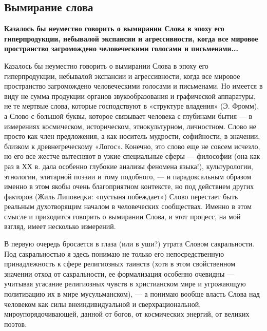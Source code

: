  
 
 

\subsection{Вымирание слова}
\label{sec:23_07_2004.news.ua.zn.1.dzuba_slovo_vymiranie}


\textbf{Казалось бы неуместно говорить о вымирании Слова в эпоху его гиперпродукции,
небывалой экспансии и агрессивности, когда все мировое пространство
загромождено человеческими голосами и письменами...}

Казалось бы неуместно говорить о вымирании Слова в эпоху его гиперпродукции,
небывалой экспансии и агрессивности, когда все мировое пространство
загромождено человеческими голосами и письменами. Но имеется в виду не сумма
продукции органов звукообразования и графической аппаратуры, не те мертвые
слова, которые господствуют в «структуре владения» (Э. Фромм), а Слово с
большой буквы, которое связывает человека с глубинами бытия --- в измерениях
космическом, историческом, этнокультурном, личностном. Слово не просто как член
предложения, а как носитель мудрости, софийности, в значении, близком к
древнегреческому «Логос». Конечно, это слово еще не совсем исчезло, но его все
жестче вытесняют в узкие специальные сферы --- философии (она как раз в ХХ в.
дала особенно глубокие анализы феномена языка!), культурологии, этнологии,
элитарной поэзии и тому подобного, --- и парадоксальным образом именно в этом
якобы очень благоприятном контексте, но под действием других факторов (Жиль
Липовецки: «пустыня побеждает») Слово перестает быть реальным духотворящим
началом в человеческих сообществах. Именно в этом смысле и приходится говорить
о вымирании Слова, и этот процесс, на мой взгляд, имеет несколько измерений.

В первую очередь бросается в глаза (или в уши?) утрата Словом сакральности. Под
сакральностью я здесь понимаю не только его непосредственную принадлежность к
сфере религиозных таинств (хотя в этом свойственном значении отход от
сакральности, ее формализация особенно очевидны --- учитывая угасание религиозных
чувств в христианском мире и угрожающую политизацию их в мире мусульманском), —
а понимаю вообще власть Слова над человеком как силы внеиндивидуальной и
сверхрациональной, мироупорядочивающей, данной от богов, от космических
энергий, от великих поэтов.

